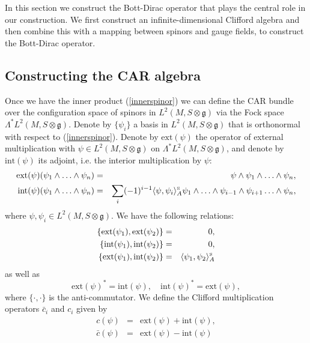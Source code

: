 \documentclass[letterpaper,11pt]{article}
\newcommand{\nn}{\nonumber}
\begin{document}
In this section we construct the Bott-Dirac operator that plays the central role in our construction. We first construct an infinite-dimensional Clifford algebra and then combine this with a mapping between spinors and gauge fields, to construct the Bott-Dirac operator. 






\subsection{Constructing the CAR algebra}




Once we have the inner product (\ref{innerspinor}) we can define the CAR bundle over the configuration space of spinors in $L^2(M,S\otimes \mathfrak{g})$ via the Fock space $\Lambda^* L^2(M,S\otimes \mathfrak{g})$. Denote by $\{\psi_i\}$ a basis in $L^2(M,S\otimes \mathfrak{g})$ that is orthonormal with respect to (\ref{innerspinor}).
Denote by $\mbox{ext}(\psi)$ the operator of external multiplication with $\psi\in L^2(M,S\otimes \mathfrak{g})$ on $\Lambda^*L^2(M,S\otimes \mathfrak{g})$, and denote by $\mbox{int}(\psi)$ its adjoint, i.e. the interior multiplication by $\psi$:
\begin{eqnarray}
\mbox{ext}(\psi) (\psi_1 \wedge  \ldots \wedge \psi_n) &=&  \psi\wedge \psi_1 \wedge  \ldots \wedge \psi_n,
\nn\\
\mbox{int} (\psi) (\psi_1 \wedge  \ldots \wedge \psi_n) &=& \sum_i (-1)^{i-1} \langle \psi, \psi_i \rangle_A^{\mbox{\tiny S}} \psi_1 \wedge \ldots \wedge \psi_{i-1} \wedge \psi_{i+1} \ldots \wedge \psi_n,
\nn
\end{eqnarray}
where $\psi, \psi_i\in L^2(M,S\otimes \mathfrak{g})$. We have the following relations:
\begin{eqnarray}
\{\mbox{ext}(\psi_1), \mbox{ext}(\psi_2)  \} &=& 0,
\nn\\
\{\mbox{int}(\psi_1), \mbox{int}(\psi_2)  \} &=& 0,
\nn\\
\{\mbox{ext}(\psi_1), \mbox{int}(\psi_2)  \} &=& \langle \psi_1, \psi_2 \rangle_A^{\mbox{\tiny S}}  
\end{eqnarray}
as well as
$$
\mbox{ext}(\psi)^* = \mbox{int}(\psi),\quad \mbox{int}(\psi)^* = \mbox{ext}(\psi),
$$
where $\{\cdot,\cdot\}$ is the anti-commutator. We define  the Clifford multiplication operators $\bar{c}_i$ and $c_i$ given by
\begin{eqnarray}
  c(\psi) &=& \mbox{ext}(\psi) + \mbox{int}(\psi),
\nn\\
 \bar{c}(\psi) &=& \mbox{ext}(\psi) - \mbox{int}(\psi) 
\end{eqnarray}
\end{document}
